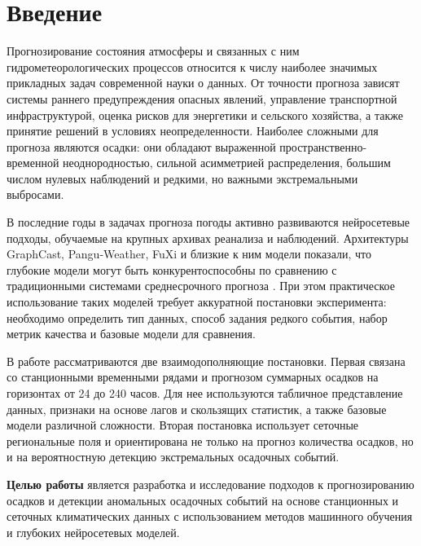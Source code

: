 \chapter*{Введение}

Прогнозирование состояния атмосферы и связанных с ним гидрометеорологических процессов относится к числу наиболее значимых прикладных задач современной науки о данных. От точности прогноза зависят системы раннего предупреждения опасных явлений, управление транспортной инфраструктурой, оценка рисков для энергетики и сельского хозяйства, а также принятие решений в условиях неопределенности. Наиболее сложными для прогноза являются осадки: они обладают выраженной пространственно-временной неоднородностью, сильной асимметрией распределения, большим числом нулевых наблюдений и редкими, но важными экстремальными выбросами.

В последние годы в задачах прогноза погоды активно развиваются нейросетевые подходы, обучаемые на крупных архивах реанализа и наблюдений. Архитектуры GraphCast, Pangu-Weather, FuXi и близкие к ним модели показали, что глубокие модели могут быть конкурентоспособны по сравнению с традиционными системами среднесрочного прогноза \cite{graphcast2023,pangu2023,fuxi2023}. При этом практическое использование таких моделей требует аккуратной постановки эксперимента: необходимо определить тип данных, способ задания редкого события, набор метрик качества и базовые модели для сравнения.

В работе рассматриваются две взаимодополняющие постановки. Первая связана со станционными временными рядами и прогнозом суммарных осадков на горизонтах от 24 до 240 часов. Для нее используются табличное представление данных, признаки на основе лагов и скользящих статистик, а также базовые модели различной сложности. Вторая постановка использует сеточные региональные поля и ориентирована не только на прогноз количества осадков, но и на вероятностную детекцию экстремальных осадочных событий.

\textbf{Целью работы} является разработка и исследование подходов к прогнозированию осадков и детекции аномальных осадочных событий на основе станционных и сеточных климатических данных с использованием методов машинного обучения и глубоких нейросетевых моделей.

